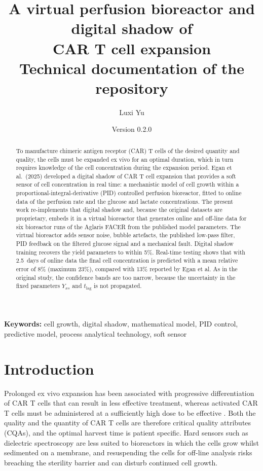 \documentclass[11pt,a4paper]{article}
\title{\color{accent}\textbf{A virtual perfusion bioreactor and digital shadow of\\ CAR T cell expansion}\\[4pt]
\large Technical documentation of the \code{closed-loop-cell-therapy} repository}
\author{Luxi Yu}
\date{Version 0.2.0}
\newcommand{\tlag}{t_{\mathrm{lag}}}
\begin{document}
\maketitle
\thispagestyle{fancy}

\begin{abstract}
\noindent To manufacture chimeric antigen receptor (CAR) T cells of the desired quantity and
quality, the cells must be expanded ex vivo for an optimal duration, which in turn requires
knowledge of the cell concentration during the expansion period. Egan et al.\ (2025) developed a
digital shadow of CAR T cell expansion that provides a soft sensor of cell concentration in real
time: a mechanistic model of cell growth within a proportional-integral-derivative (PID) controlled
perfusion bioreactor, fitted to online data of the perfusion rate and the glucose and lactate
concentrations. The present work re-implements that digital shadow and, because the original
datasets are proprietary, embeds it in a virtual bioreactor that generates online and off-line data
for six bioreactor runs of the Aglaris FACER from the published model parameters. The virtual
bioreactor adds sensor noise, bubble artefacts, the published low-pass filter, PID feedback on the
filtered glucose signal and a mechanical fault. Digital shadow training recovers the yield
parameters to within 5\%. Real-time testing shows that with 2.5~days of online data the final cell
concentration is predicted with a mean relative error of 8\% (maximum 23\%), compared with 13\%
reported by Egan et al. As in the original study, the confidence bands are too narrow, because the
uncertainty in the fixed parameters $Y_{xs}$ and $\tlag$ is not propagated.
\end{abstract}

\textbf{Keywords:} cell growth, digital shadow, mathematical model, PID control, predictive model,
process analytical technology, soft sensor

\tableofcontents

\section{Introduction}

Prolonged ex vivo expansion has been associated with progressive differentiation of CAR T cells
that can result in less effective treatment, whereas activated CAR T cells must be administered at a
sufficiently high dose to be effective \cite{egan2025}. Both the quality and the quantity of CAR T
cells are therefore critical quality attributes (CQAs), and the optimal harvest time is patient
specific. Hard sensors such as dielectric spectroscopy are less suited to bioreactors in which the
cells grow whilst sedimented on a membrane, and resuspending the cells for off-line analysis risks
breaching the sterility barrier and can disturb continued cell growth.
\end{document}

